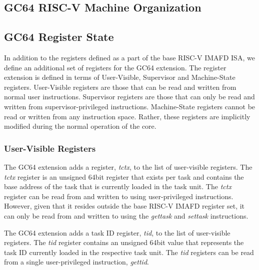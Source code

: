 \documentclass{article}
\begin{document}
\subsection{GC64 RISC-V Machine Organization}

\subsection{GC64 Register State}
In addition to the registers defined as a part of the base RISC-V IMAFD ISA, we define an additional set of registers for the GC64 extension.  The register extension is defined in terms of User-Visible, Supervisor and Machine-State registers.  User-Visible registers are those that can be read and written from normal user instructions.  Supervisor registers are those that can only be read and written from supervisor-privileged instructions.  Machine-State registers cannot be read or written from any instruction space.  Rather, these registers are implicitly modified during the normal operation of the core.     

\subsubsection{User-Visible Registers} 
The GC64 extension adds a register, \emph{tctx}, to the list of user-visible registers.  The \emph{tctx} register is an unsigned 64bit register that exists per task and contains the base address of the task that is currently loaded in the task unit. The \emph{tctx} register can be read from and written to using user-privileged instructions.  However, given that it resides outside the base RISC-V IMAFD register set, it can only be read from and written to using the \emph{gettask} and \emph{settask} instructions.  

\begin{center}
\end{center}

The GC64 extension adds a task ID register, \emph{tid}, to the list of user-visible registers.  The \emph{tid} register contains an unsigned 64bit value that represents the task ID currently loaded in the respective task unit.  The \emph{tid} registers can be read from a single user-privileged instruction, \emph{gettid}.  

\begin{center}
\end{center}
\end{document}

